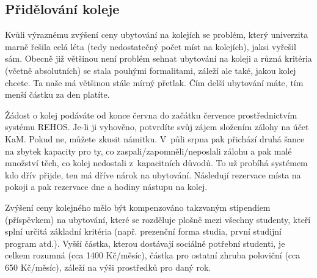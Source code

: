 \subsection{Přidělování koleje}

Kvůli výraznému zvýšení ceny ubytování na kolejích se problém,
který univerzita marně řešila celá léta (tedy nedostatečný počet
míst na kolejích), jaksi vyřešil sám. Obecně již většinou není
problém sehnat ubytování na koleji a různá kritéria (včetně
absolutních) se stala pouhými formalitami, záleží ale také, jakou
kolej chcete. Ta naše má většinou stále mírný přetlak. Čím delší
ubytování máte, tím menší částku za den platíte.

Žádost o kolej podáváte od konce června do začátku července
prostřednictvím systému REHOS. Je-li ji vyhověno, potvrdíte svůj
zájem složením zálohy na účet KaM. Pokud ne, můžete zkusit
námitku. V~půli srpna pak přichází druhá šance na zbytek kapacity
pro ty, co zaspali/zapomněli/neposlali zálohu a pak malé množství
těch, co kolej nedostali z~kapacitních důvodů. To už probíhá
systémem kdo dřív přijde, ten má dříve nárok na ubytování.
Následují rezervace místa na pokoji a pak rezervace dne a hodiny
nástupu na kolej.

Zvýšení ceny kolejného mělo být kompenzováno takzvaným stipendiem
(pří\-spě\-vkem) na ubytování, které se rozděluje plošně mezi všechny
studenty, kteří splní určitá základní kritéria (např. prezenční
forma studia, první studijní program atd.). Vyšší částka, kterou
dostávají sociálně potřební studenti, je celkem rozumná (cca 1400
Kč/měsíc), částka pro ostatní zhruba poloviční (cca 650 Kč/měsíc),
záleží na výši prostředků pro daný rok.